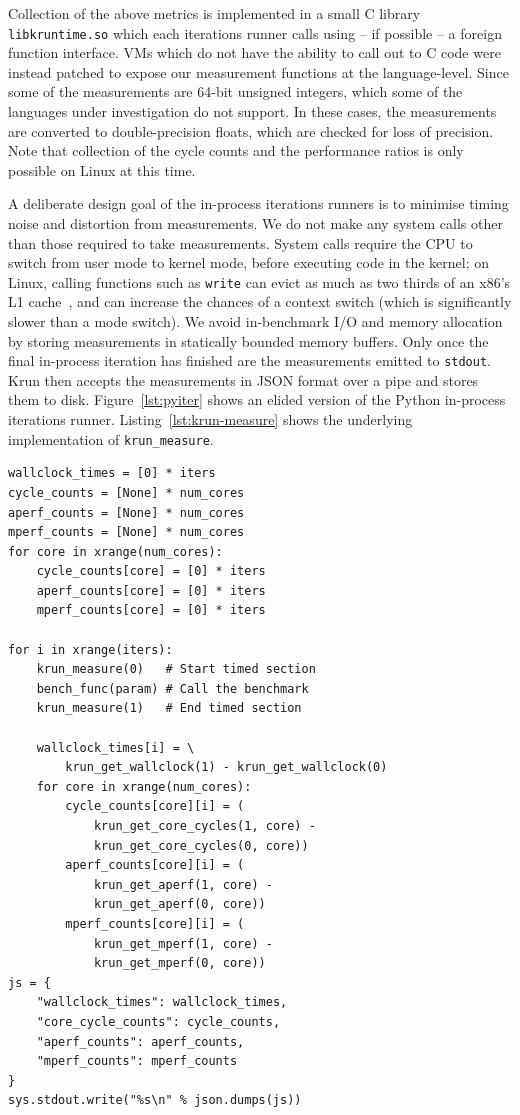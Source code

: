 \documentclass[preprint,numbers,10pt]{sigplanconf}
\newcommand{\krun}{Krun\xspace}
\begin{document}
Collection of the above metrics is implemented in a small C library
\texttt{libkruntime.so} which each iterations runner calls using -- if possible
-- a foreign function interface. VMs which do not have the ability to call out
to C code were instead patched to expose our measurement functions at the
language-level. Since some of the measurements are 64-bit unsigned integers,
which some of the languages under investigation do not support. In these cases,
the measurements are converted to double-precision floats, which are checked
for loss of precision. Note that collection of the cycle counts and the
performance
ratios is only possible on Linux at this time.

A deliberate design goal of the in-process iterations runners is to minimise
timing noise and distortion from measurements. We do not make any system calls
other than those required to take measurements. System calls require the CPU to
switch from user mode to kernel mode, before executing code in the kernel; on
Linux, calling functions such as \texttt{write} can evict as much as two thirds
of an x86's L1 cache~\cite{soares10flexsc}, and can increase the chances of a
context switch (which is significantly slower than a mode switch). We avoid
in-benchmark I/O and memory allocation by storing measurements in statically
bounded memory buffers. Only once the final in-process iteration has finished
are the measurements emitted to \texttt{stdout}. \krun then accepts the
measurements in JSON format over a pipe and stores them to disk.
Figure~\ref{lst:pyiter} shows
an elided version of the Python in-process iterations runner.
Listing~\ref{lst:krun-measure} shows the underlying implementation of
\texttt{krun\_measure}.

\begin{lstlisting}[label=lst:pyiter, caption={The Python in-process iterations runner.}]
wallclock_times = [0] * iters
cycle_counts = [None] * num_cores
aperf_counts = [None] * num_cores
mperf_counts = [None] * num_cores
for core in xrange(num_cores):
    cycle_counts[core] = [0] * iters
    aperf_counts[core] = [0] * iters
    mperf_counts[core] = [0] * iters

for i in xrange(iters):
    krun_measure(0)   # Start timed section
    bench_func(param) # Call the benchmark
    krun_measure(1)   # End timed section

    wallclock_times[i] = \
        krun_get_wallclock(1) - krun_get_wallclock(0)
    for core in xrange(num_cores):
        cycle_counts[core][i] = (
            krun_get_core_cycles(1, core) -
            krun_get_core_cycles(0, core))
        aperf_counts[core][i] = (
            krun_get_aperf(1, core) -
            krun_get_aperf(0, core))
        mperf_counts[core][i] = (
            krun_get_mperf(1, core) -
            krun_get_mperf(0, core))
js = {
    "wallclock_times": wallclock_times,
    "core_cycle_counts": cycle_counts,
    "aperf_counts": aperf_counts,
    "mperf_counts": mperf_counts
}
sys.stdout.write("%s\n" % json.dumps(js))
\end{lstlisting}
\end{document}
